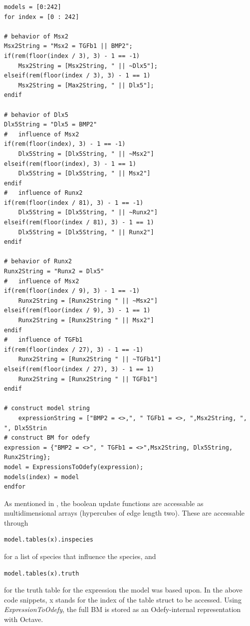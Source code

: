 \documentclass[11pt]{article}
\begin{document}
\begin{lstlisting}
models = [0:242]
for index = [0 : 242]

# behavior of Msx2
Msx2String = "Msx2 = TGFb1 || BMP2";
if(rem(floor(index / 3), 3) - 1 == -1)
	Msx2String = [Msx2String, " || ~Dlx5"];
elseif(rem(floor(index / 3), 3) - 1 == 1)
	Msx2String = [Max2String, " || Dlx5"];
endif

# behavior of Dlx5
Dlx5String = "Dlx5 = BMP2"
#	influence of Msx2
if(rem(floor(index), 3) - 1 == -1)
	Dlx5String = [Dlx5String, " || ~Msx2"]
elseif(rem(floor(index), 3) - 1 == 1)
	Dlx5String = [Dlx5String, " || Msx2"]
endif
#	influence of Runx2
if(rem(floor(index / 81), 3) - 1 == -1)
	Dlx5String = [Dlx5String, " || ~Runx2"]
elseif(rem(floor(index / 81), 3) - 1 == 1)
	Dlx5String = [Dlx5String, " || Runx2"]
endif

# behavior of Runx2
Runx2String = "Runx2 = Dlx5"
#	influence of Msx2
if(rem(floor(index / 9), 3) - 1 == -1)
	Runx2String = [Runx2String " || ~Msx2"]
elseif(rem(floor(index / 9), 3) - 1 == 1)
	Runx2String = [Runx2String " || Msx2"]
endif
#	influence of TGFb1
if(rem(floor(index / 27), 3) - 1 == -1)
	Runx2String = [Runx2String " || ~TGFb1"]
elseif(rem(floor(index / 27), 3) - 1 == 1)
	Runx2String = [Runx2String " || TGFb1"]
endif

# construct model string
	expressionString = ["BMP2 = <>,", " TGFb1 = <>, ",Msx2String, ", ", Dlx5Strin
# construct BM for odefy
expression = {"BMP2 = <>", " TGFb1 = <>",Msx2String, Dlx5String, Runx2String};
model = ExpressionsToOdefy(expression);
models(index) = model
endfor
\end{lstlisting}

As mentioned in \cite{Krumsiek}, the boolean update functions are accessable as multidimensional arrays (hypercubes of edge length two). These are accessable through
\begin{lstlisting}
model.tables(x).inspecies
\end{lstlisting}

for a list of species that influence the species, and
\begin{lstlisting}
model.tables(x).truth
\end{lstlisting}

for the truth table for the expression the model was based upon. In the above code snippets, x stands for the index of the table struct to be accessed. Using \textit{ExpressionToOdefy}, the full BM is stored as an Odefy-internal representation with Octave.
\end{document}
